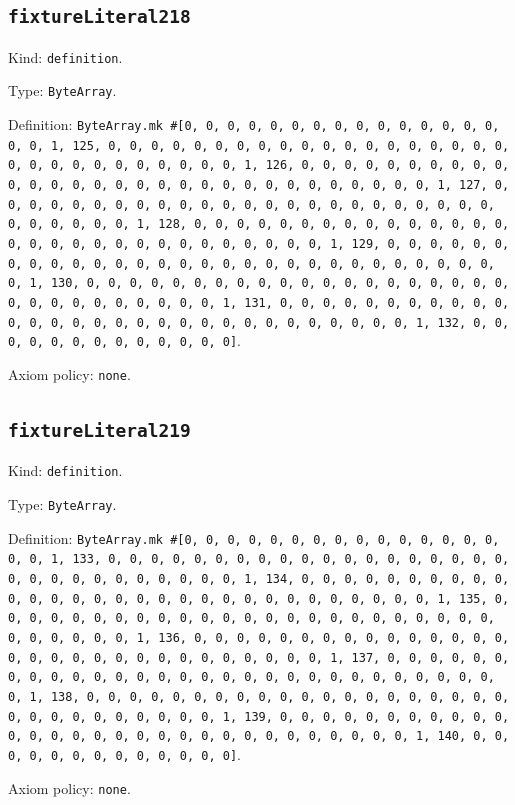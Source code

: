 \documentclass[11pt]{article}
\begin{document}
\subsection*{\texttt{fixtureLiteral218}}
\noindent Kind: \texttt{definition}.\par
\noindent Type: \texttt{ByteArray}.\par
\noindent Definition: \texttt{ByteArray.mk \#[0, 0, 0, 0, 0, 0, 0, 0, 0, 0, 0, 0, 0, 0, 0, 0, 0, 1, 125, 0, 0, 0, 0, 0, 0, 0, 0, 0, 0, 0, 0, 0, 0, 0, 0, 0, 0, 0, 0, 0, 0, 0, 0, 0, 0, 0, 0, 0, 0, 1, 126, 0, 0, 0, 0, 0, 0, 0, 0, 0, 0, 0, 0, 0, 0, 0, 0, 0, 0, 0, 0, 0, 0, 0, 0, 0, 0, 0, 0, 0, 0, 1, 127, 0, 0, 0, 0, 0, 0, 0, 0, 0, 0, 0, 0, 0, 0, 0, 0, 0, 0, 0, 0, 0, 0, 0, 0, 0, 0, 0, 0, 0, 0, 1, 128, 0, 0, 0, 0, 0, 0, 0, 0, 0, 0, 0, 0, 0, 0, 0, 0, 0, 0, 0, 0, 0, 0, 0, 0, 0, 0, 0, 0, 0, 0, 1, 129, 0, 0, 0, 0, 0, 0, 0, 0, 0, 0, 0, 0, 0, 0, 0, 0, 0, 0, 0, 0, 0, 0, 0, 0, 0, 0, 0, 0, 0, 0, 1, 130, 0, 0, 0, 0, 0, 0, 0, 0, 0, 0, 0, 0, 0, 0, 0, 0, 0, 0, 0, 0, 0, 0, 0, 0, 0, 0, 0, 0, 0, 0, 1, 131, 0, 0, 0, 0, 0, 0, 0, 0, 0, 0, 0, 0, 0, 0, 0, 0, 0, 0, 0, 0, 0, 0, 0, 0, 0, 0, 0, 0, 0, 0, 1, 132, 0, 0, 0, 0, 0, 0, 0, 0, 0, 0, 0, 0, 0]}.\par
\noindent Axiom policy: \texttt{none}.\par
\subsection*{\texttt{fixtureLiteral219}}
\noindent Kind: \texttt{definition}.\par
\noindent Type: \texttt{ByteArray}.\par
\noindent Definition: \texttt{ByteArray.mk \#[0, 0, 0, 0, 0, 0, 0, 0, 0, 0, 0, 0, 0, 0, 0, 0, 0, 1, 133, 0, 0, 0, 0, 0, 0, 0, 0, 0, 0, 0, 0, 0, 0, 0, 0, 0, 0, 0, 0, 0, 0, 0, 0, 0, 0, 0, 0, 0, 0, 1, 134, 0, 0, 0, 0, 0, 0, 0, 0, 0, 0, 0, 0, 0, 0, 0, 0, 0, 0, 0, 0, 0, 0, 0, 0, 0, 0, 0, 0, 0, 0, 1, 135, 0, 0, 0, 0, 0, 0, 0, 0, 0, 0, 0, 0, 0, 0, 0, 0, 0, 0, 0, 0, 0, 0, 0, 0, 0, 0, 0, 0, 0, 0, 1, 136, 0, 0, 0, 0, 0, 0, 0, 0, 0, 0, 0, 0, 0, 0, 0, 0, 0, 0, 0, 0, 0, 0, 0, 0, 0, 0, 0, 0, 0, 0, 1, 137, 0, 0, 0, 0, 0, 0, 0, 0, 0, 0, 0, 0, 0, 0, 0, 0, 0, 0, 0, 0, 0, 0, 0, 0, 0, 0, 0, 0, 0, 0, 1, 138, 0, 0, 0, 0, 0, 0, 0, 0, 0, 0, 0, 0, 0, 0, 0, 0, 0, 0, 0, 0, 0, 0, 0, 0, 0, 0, 0, 0, 0, 0, 1, 139, 0, 0, 0, 0, 0, 0, 0, 0, 0, 0, 0, 0, 0, 0, 0, 0, 0, 0, 0, 0, 0, 0, 0, 0, 0, 0, 0, 0, 0, 0, 1, 140, 0, 0, 0, 0, 0, 0, 0, 0, 0, 0, 0, 0, 0]}.\par
\noindent Axiom policy: \texttt{none}.\par
\end{document}
